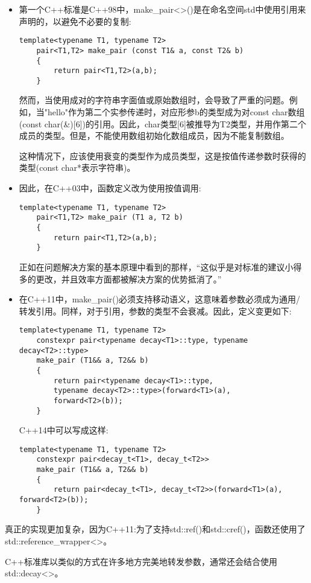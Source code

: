 \begin{itemize}
	\item 第一个C++标准是C++98中，make\_pair<>()是在命名空间std中使用引用来声明的，以避免不必要的复制:
	\begin{lstlisting}[caption={}]
	template<typename T1, typename T2>
	pair<T1,T2> make_pair (const T1& a, const T2& b)
	{
		return pair<T1,T2>(a,b);
	}
	\end{lstlisting}
	然而，当使用成对的字符串字面值或原始数组时，会导致了严重的问题。例如，当"hello"作为第二个实参传递时，对应形参b的类型成为对const char数组(const char(\&)[6])的引用。因此，char类型[6]被推导为T2类型，并用作第二个成员的类型。但是，不能使用数组初始化数组成员，因为不能复制数组。\par
	这种情况下，应该使用衰变的类型作为成员类型，这是按值传递参数时获得的类型(const char*表示字符串)。
	
	\item 因此，在C++03中，函数定义改为使用按值调用:
	\begin{lstlisting}[caption={}]
	template<typename T1, typename T2>
	pair<T1,T2> make_pair (T1 a, T2 b)
	{
		return pair<T1,T2>(a,b);
	}
	\end{lstlisting}
	正如在问题解决方案的基本原理中看到的那样，“这似乎是对标准的建议小得多的更改，并且效率方面都被解决方案的优势抵消了。”
	
	\item 在C++11中，make\_pair()必须支持移动语义，这意味着参数必须成为通用/转发引用。同样，对于引用，参数的类型不会衰减。因此，定义变更如下:
	\begin{lstlisting}[caption={}]
	template<typename T1, typename T2>
	constexpr pair<typename decay<T1>::type, typename decay<T2>::type>
	make_pair (T1&& a, T2&& b)
	{
		return pair<typename decay<T1>::type,
		typename decay<T2>::type>(forward<T1>(a),
		forward<T2>(b));
	}
	\end{lstlisting}
	C++14中可以写成这样:
	\begin{lstlisting}[caption={}]
	template<typename T1, typename T2>
	constexpr pair<decay_t<T1>, decay_t<T2>>
	make_pair (T1&& a, T2&& b)
	{
		return pair<decay_t<T1>, decay_t<T2>>(forward<T1>(a), forward<T2>(b));
	}
	\end{lstlisting}
\end{itemize}

真正的实现更加复杂，因为C++11:为了支持std::ref()和std::cref()，函数还使用了std::reference\_wrapper<>。\par

C++标准库以类似的方式在许多地方完美地转发参数，通常还会结合使用std::decay<>。\par

